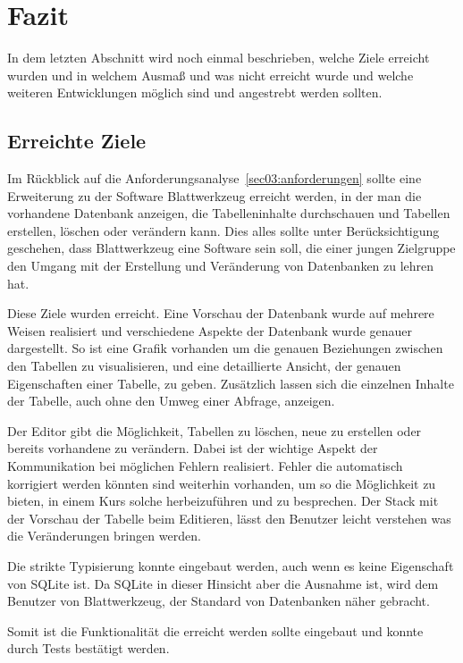 \section{Fazit}
\label{sec05:fazit}
In dem letzten Abschnitt wird noch einmal beschrieben, welche Ziele erreicht wurden und in welchem Ausmaß und was nicht erreicht wurde und welche weiteren Entwicklungen möglich sind und angestrebt werden sollten.

\subsection{Erreichte Ziele}
\label{subsec05:erreicht}
Im Rückblick auf die Anforderungsanalyse~\ref{sec03:anforderungen} sollte eine Erweiterung zu der Software Blattwerkzeug erreicht werden, in der man die vorhandene Datenbank anzeigen, die Tabelleninhalte durchschauen und Tabellen erstellen, löschen oder verändern kann. Dies alles sollte unter Berücksichtigung geschehen, dass Blattwerkzeug eine Software sein soll, die einer jungen Zielgruppe den Umgang mit der Erstellung und Veränderung von Datenbanken zu lehren hat.

Diese Ziele wurden erreicht. Eine Vorschau der Datenbank wurde auf mehrere Weisen realisiert und verschiedene Aspekte der Datenbank wurde genauer dargestellt. So ist eine Grafik vorhanden um die genauen Beziehungen zwischen den Tabellen zu visualisieren, und eine detaillierte Ansicht, der genauen Eigenschaften einer Tabelle, zu geben. Zusätzlich lassen sich die einzelnen Inhalte der Tabelle, auch ohne den Umweg einer Abfrage, anzeigen.

Der Editor gibt die Möglichkeit, Tabellen zu löschen, neue zu erstellen oder bereits vorhandene zu verändern. Dabei ist der wichtige Aspekt der Kommunikation bei möglichen Fehlern realisiert. Fehler die automatisch korrigiert werden könnten sind weiterhin vorhanden, um so die Möglichkeit zu bieten, in einem Kurs solche herbeizuführen und zu besprechen. 
Der Stack mit der Vorschau der Tabelle beim Editieren, lässt den Benutzer leicht verstehen was die Veränderungen bringen werden.

Die strikte Typisierung konnte eingebaut werden, auch wenn es keine Eigenschaft von SQLite ist. Da SQLite in dieser Hinsicht aber die Ausnahme ist, wird dem Benutzer von Blattwerkzeug, der Standard von Datenbanken näher gebracht.

Somit ist die Funktionalität die erreicht werden sollte eingebaut und konnte durch Tests bestätigt werden.

